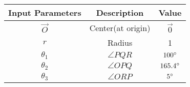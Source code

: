 \begin{tabular}{|c|c|c|}
    \hline
    \textbf{Input Parameters} &\textbf{Description} &\textbf{Value} \\
    \hline
     $\vec{O}$& Center(at origin)&$\vec{0}$\\
     \hline
 $r$ & Radius &1\\
 \hline
 $\theta_1$&$\angle PQR$&$100\degree$\\
 \hline
 $\theta_2$&$\angle OPQ $&$165.4\degree$\\
 \hline
 $\theta_3$&$\angle ORP $&$5\degree$\\
 \hline
  \end{tabular}

